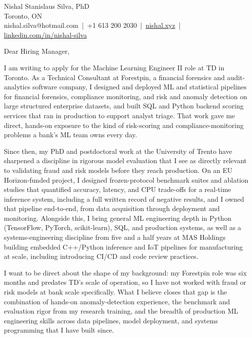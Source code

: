\documentclass[11pt]{article}
\begin{document}
\pagestyle{empty}

\noindent
Nishal Stanislaus Silva, PhD \\
Toronto, ON \\
nishal.silva@hotmail.com \,|\, +1 613 200 2030 \,|\, \href{https://nishal.xyz}{nishal.xyz} \,|\, \href{https://www.linkedin.com/in/nishal-silva}{linkedin.com/in/nishal-silva}

\vspace{1.5em}

\noindent Dear Hiring Manager,

\vspace{1em}

\noindent I am writing to apply for the Machine Learning Engineer II role at TD in Toronto. As a Technical Consultant at Forestpin, a financial forensics and audit-analytics software company, I designed and deployed ML and statistical pipelines for financial forensics, compliance monitoring, and risk and anomaly detection on large structured enterprise datasets, and built SQL and Python backend scoring services that ran in production to support analyst triage. That work gave me direct, hands-on exposure to the kind of risk-scoring and compliance-monitoring problems a bank's ML team owns every day.

\vspace{1em}

\noindent Since then, my PhD and postdoctoral work at the University of Trento have sharpened a discipline in rigorous model evaluation that I see as directly relevant to validating fraud and risk models before they reach production. On an EU Horizon-funded project, I designed frozen-protocol benchmark suites and ablation studies that quantified accuracy, latency, and CPU trade-offs for a real-time inference system, including a full written record of negative results, and I owned that pipeline end-to-end, from data acquisition through deployment and monitoring. Alongside this, I bring general ML engineering depth in Python (TensorFlow, PyTorch, scikit-learn), SQL, and production systems, as well as a systems-engineering discipline from five and a half years at MAS Holdings building embedded C++/Python inference and IoT pipelines for manufacturing at scale, including introducing CI/CD and code review practices.

\vspace{1em}

\noindent I want to be direct about the shape of my background: my Forestpin role was six months and predates TD's scale of operation, so I have not worked with fraud or risk models at bank scale specifically. What I believe closes that gap is the combination of hands-on anomaly-detection experience, the benchmark and evaluation rigor from my research training, and the breadth of production ML engineering skills across data pipelines, model deployment, and systems programming that I have built since.
\end{document}
